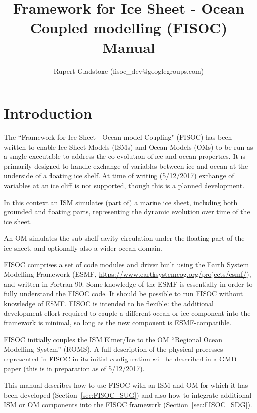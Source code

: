 \documentclass[11pt]{article}
\begin{document}
\title{Framework for Ice Sheet - Ocean Coupled modelling (FISOC) Manual}
\author{Rupert Gladstone (fisoc\_dev@googlegroups.com)}

\maketitle

\newpage 
\tableofcontents
\newpage 

\section{Introduction}

The ``Framework for Ice Sheet - Ocean model Coupling" (FISOC) has been written to enable Ice Sheet Models 
(ISMs) and Ocean Models (OMs) to be run as a single executable to address the co-evolution of ice and ocean 
properties.  
It is primarily designed to handle exchange of variables between ice and ocean at the underside of a floating ice shelf.
At time of writing (5/12/2017) exchange of variables at an ice cliff is 
not supported, though this is a planned development.

In this context an ISM simulates (part of) a marine ice sheet, including both grounded and floating parts, 
representing the dynamic evolution over time of the ice sheet.

An OM simulates the sub-shelf cavity circulation under the floating part of the ice sheet, and optionally also 
a wider ocean domain.

FISOC comprises a set of code modules and driver built using the Earth System Modelling Framework (ESMF, 
\url{https://www.earthsystemcog.org/projects/esmf/}), and written in Fortran 90. 
Some knowledge of the ESMF is essentially in order to fully understand the FISOC code.  It should 
be possible to run FISOC without knowledge of ESMF.
FISOC is intended to be flexible: the additional development effort required to 
couple a different ocean or ice component into the framework is minimal, so 
long as the new component is ESMF-compatible. 

FISOC initially couples the ISM Elmer/Ice to the OM ``Regional Ocean Modelling System'' (ROMS).
A full description of the physical processes represented in FISOC in its 
initial configuration will be described in a GMD paper (this is in 
preparation as of 5/12/2017).

This manual describes how to use FISOC with an ISM and OM for which it has been 
developed (Section~\ref{sec:FISOC_SUG}) and also how to integrate 
additional ISM or OM components 
into the FISOC framework (Section~\ref{sec:FISOC_SDG}).
\end{document}
